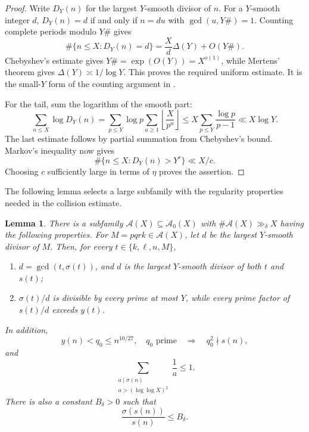 \documentclass[11pt,letterpaper,reqno]{amsart}
\numberwithin{equation}{section}
\newtheorem{lemma}[theorem]{Lemma}
\theoremstyle{remark}
\newcommand{\1}{\mathbf 1}
\renewcommand{\leq}{\leqslant}
\renewcommand{\geq}{\geqslant}
\begin{document}
\begin{proof}
Write $D_Y(n)$ for the largest $Y$-smooth divisor of $n$. For a
$Y$-smooth integer $d$,
$D_Y(n)=d$ if and only if $n=du$ with $\gcd(u,Y\#)=1$. Counting complete
periods modulo $Y\#$ gives
\[
 \#\{n\leq X:D_Y(n)=d\}
 =\frac Xd\Delta(Y)+O(Y\#).
\]
Chebyshev's estimate gives $Y\#=\exp(O(Y))=X^{o(1)}$, while Mertens'
theorem gives $\Delta(Y)\asymp1/\log Y$. This proves the required
uniform estimate. It is the small-$Y$ form of the counting argument
in \cite[(3.1)]{LucaPomerance}.

For the tail, sum the logarithm of the smooth part:
\[
 \sum_{n\leq X}\log D_Y(n)
 =\sum_{p\leq Y}\log p\sum_{a\geq1}
 \left\lfloor\frac X{p^a}\right\rfloor
 \leq X\sum_{p\leq Y}\frac{\log p}{p-1}
 \ll X\log Y.
\]
The last estimate follows by partial summation from Chebyshev's bound.
Markov's inequality now gives
\[
 \#\{n\leq X:D_Y(n)>Y^c\}\ll X/c.
\]
Choosing $c$ sufficiently large in terms of $\eta$ proves the assertion.
\end{proof}

The following lemma selects a large subfamily with the regularity properties
needed in the collision estimate.

\begin{lemma}\label{lem:sv-regular}
There is a subfamily $\mathcal{A}(X)\subseteq\mathcal{A}_0(X)$ with
$\#\mathcal{A}(X)\gg_\delta X$ having the following properties. For
$M=pqrk\in\mathcal{A}(X)$, let $d$ be the largest $Y$-smooth divisor of
$M$. Then, for every $t\in\{k,\ell,n,M\}$,
\begin{enumerate}
\item $d=\gcd(t,\sigma(t))$, and $d$ is the largest $Y$-smooth divisor of
 both $t$ and $s(t)$;
\item $\sigma(t)/d$ is divisible by every prime at most $Y$, while every
 prime factor of $s(t)/d$ exceeds $y(t)$.
\end{enumerate}
In addition,
\[
 y(n)<q_0\leq n^{10/27},\quad q_0\text{ prime}
 \quad\Longrightarrow\quad q_0^2\nmid s(n),
\]
and
\begin{equation}\label{eq:sv-LP25}
 \sum_{\substack{a\mid\sigma(n)\\a>(\log\log X)^2}}\frac1a\leq1.
\end{equation}
There is also a constant $B_\delta>0$ such that
\begin{equation}\label{eq:sv-image-abundancy}
 \frac{\sigma(s(n))}{s(n)}\leq B_\delta.
\end{equation}
\end{lemma}
\end{document}

